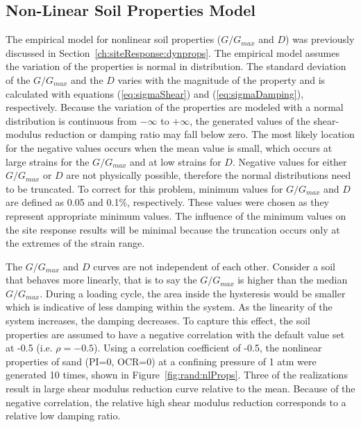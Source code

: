 \documentclass[11pt]{report}
\begin{document}
\subsection{Non-Linear Soil Properties Model} 
The \citet{darendeli:01} empirical model for nonlinear soil properties ($G/G_{max}$ and $D$) was
previously discussed in Section~\ref{ch:siteResponse:dynprops}.  The \citet{darendeli:01} empirical
model assumes the variation of the properties is normal in distribution.  The standard deviation of
the $G/G_{max}$ and the $D$ varies with the magnitude of the property and is calculated with
equations (\ref{eq:sigmaShear}) and (\ref{eq:sigmaDamping}), respectively.  Because the variation of
the properties are modeled with a normal distribution is continuous from $-\infty$ to $+\infty$, the
generated values of the shear-modulus reduction or damping ratio may fall below zero.  The most
likely location for the negative values occurs when the mean value is small, which occurs at large
strains for the $G/G_{max}$ and at low strains for $D$.  Negative values for either $G/G_{max}$ or
$D$ are not physically possible, therefore the normal distributions need to be truncated.  To
correct for this problem, minimum values for $G/G_{max}$ and $D$ are defined as 0.05 and 0.1\%,
respectively.  These values were chosen as they represent appropriate minimum values.  The influence
of the minimum values on the site response results will be minimal because the truncation occurs
only at the extremes of the strain range.

The $G/G_{max}$ and $D$ curves are not independent of each other.  Consider a soil that behaves
more linearly, that is to say the $G/G_{max}$ is higher than the median $G/G_{max}$.  During a
loading cycle, the area inside the hysteresis would be smaller which is indicative of less damping
within the system.  As the linearity of the system increases, the damping decreases.  To capture
this effect, the soil properties are assumed to have a negative correlation with the default value
set at -0.5 (i.e.  $\rho=-0.5$).  Using a correlation coefficient of -0.5, the nonlinear properties
of sand (PI=0, OCR=0) at a confining pressure of 1 atm were generated 10 times, shown in
Figure~\ref{fig:rand:nlProps}.  Three of the realizations result in large shear modulus reduction
curve relative to the mean.  Because of the negative correlation, the relative high shear modulus
reduction corresponds to a relative low damping ratio.
\end{document}
